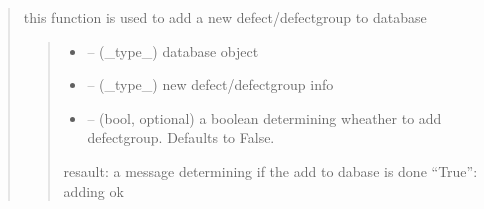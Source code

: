 \documentclass[letterpaper,10pt,english]{sphinxmanual}
\begin{document}
\begin{quote}
\begin{savenotes}\begin{fulllineitems}
\label{\detokenize{setting/backend/defect_management_funcs:oxin.backend.defect_management_funcs.add_new_defect_to_db}}
\pysigstartsignatures
{}
\pysigstopsignatures
\sphinxAtStartPar
this function is used to add a new defect/defect\sphinxhyphen{}group to database
\begin{quote}\begin{description}
\begin{itemize}
\item {} 
\sphinxAtStartPar
{} – (\_type\_) database object

\item {} 
\sphinxAtStartPar
{} – (\_type\_) new defect/defect\sphinxhyphen{}group info

\item {} 
\sphinxAtStartPar
{} – (bool, optional) a boolean determining wheather to add defect\sphinxhyphen{}group. Defaults to False.

\end{itemize}

\sphinxAtStartPar
resault: a message determining if the add to dabase is done “True”: adding ok

\end{description}\end{quote}

\end{fulllineitems}\end{savenotes}



\end{quote}
\end{document}
